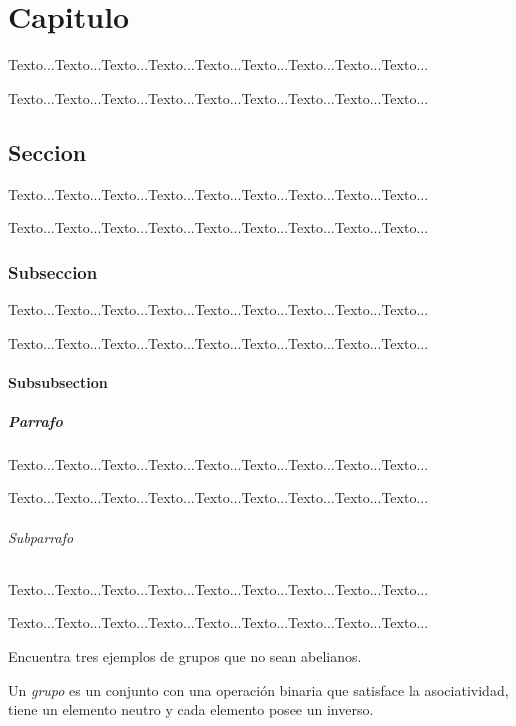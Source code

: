 \cleardoublepage

\chapter{Capitulo}
\fancyhead{} %
\thispagestyle{fancy}

Texto...Texto...Texto...Texto...Texto...Texto...Texto...Texto...Texto...

Texto...Texto...Texto...Texto...Texto...Texto...Texto...Texto...Texto...
\section{Seccion} 
Texto...Texto...Texto...Texto...Texto...Texto...Texto...Texto...Texto...

Texto...Texto...Texto...Texto...Texto...Texto...Texto...Texto...Texto...
\subsection{Subseccion}
Texto...Texto...Texto...Texto...Texto...Texto...Texto...Texto...Texto...

Texto...Texto...Texto...Texto...Texto...Texto...Texto...Texto...Texto...
\subsubsection{Subsubsection}

\paragraph{Parrafo}
Texto...Texto...Texto...Texto...Texto...Texto...Texto...Texto...Texto...

Texto...Texto...Texto...Texto...Texto...Texto...Texto...Texto...Texto...
\subparagraph{Subparrafo}
Texto...Texto...Texto...Texto...Texto...Texto...Texto...Texto...Texto...

Texto...Texto...Texto...Texto...Texto...Texto...Texto...Texto...Texto...


 \begin{activity}
  Encuentra tres ejemplos de grupos que no sean abelianos.
\end{activity}

\begin{definition}
  Un \emph{grupo} es un conjunto con una operación binaria que satisface la asociatividad, tiene un elemento neutro y cada elemento posee un inverso.
\end{definition}

